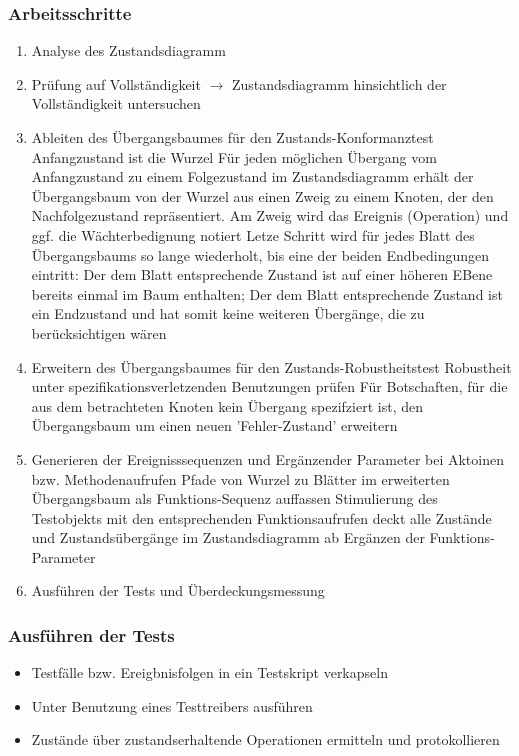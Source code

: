 \documentclass{report}
\theoremstyle{definition}
\theoremstyle{example}
\begin{document}
\subsubsection{Arbeitsschritte}
\begin{enumerate}
   \item Analyse des Zustandsdiagramm
   \item Prüfung auf Vollständigkeit $\rightarrow$ Zustandsdiagramm hinsichtlich der Vollständigkeit untersuchen
   \item Ableiten des Übergangsbaumes für den Zustands-Konformanztest
   \subitem Anfangzustand ist die Wurzel
   \subitem Für jeden möglichen Übergang vom Anfangzustand zu einem Folgezustand im Zustandsdiagramm erhält der Übergangsbaum von der Wurzel aus einen Zweig zu einem Knoten, der den Nachfolgezustand repräsentiert. Am Zweig wird das Ereignis (Operation) und ggf. die Wächterbedignung notiert
   \subitem Letze Schritt wird für jedes Blatt des Übergangsbaums so lange wiederholt, bis eine der beiden Endbedingungen eintritt: 
   \subsubitem [A] Der dem Blatt entsprechende Zustand ist auf einer höheren EBene bereits einmal im Baum enthalten; 
   \subsubitem [B] Der dem Blatt entsprechende Zustand ist ein Endzustand und hat somit keine weiteren Übergänge, die zu berücksichtigen wären
   \item Erweitern des Übergangsbaumes für den Zustands-Robustheitstest
   \subitem Robustheit unter spezifikationsverletzenden Benutzungen prüfen
   \subitem Für Botschaften, für die aus dem betrachteten Knoten kein Übergang spezifziert ist, den Übergangsbaum um einen neuen 'Fehler-Zustand' erweitern 
   \item Generieren der Ereignisssequenzen und Ergänzender Parameter bei Aktoinen bzw. Methodenaufrufen
   \subitem Pfade von Wurzel zu Blätter im erweiterten Übergangsbaum als Funktions-Sequenz auffassen
   \subitem Stimulierung des Testobjekts mit den entsprechenden Funktionsaufrufen deckt alle Zustände und Zustandsübergänge im Zustandsdiagramm ab
   \subitem Ergänzen der Funktions-Parameter 
   \item Ausführen der Tests und Überdeckungsmessung
\end{enumerate}

\subsubsection{Ausführen der Tests}
\begin{itemize}
   \item Testfälle bzw. Ereigbnisfolgen in ein Testskript verkapseln
   \item Unter Benutzung eines Testtreibers ausführen
   \item Zustände über zustandserhaltende Operationen ermitteln und protokollieren
\end{itemize}
\end{document}

